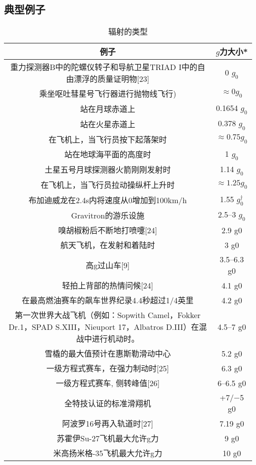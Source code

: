 \subsection{典型例子}
\begin{table}[ht]
\centering
\caption{辐射的类型}\label{GLI}
\begin{tabular}{|c|c}
\hline
\textbf{例子} & \textbf{$g$力大小*}\\
\hline
重力探测器B中的陀螺仪转子和导航卫星TRIAD I中的自由漂浮的质量证明物[23] & 0 $g_0$\\
\hline
乘坐呕吐彗星号飞行器进行抛物线飞行) & $\approx 0 g_0$ \\
\hline
站在月球赤道上 & 0.1654 $g_0$ \\
\hline
站在火星赤道上 & 0.378 $g_0$ \\
\hline
在飞机上，当飞行员按下起落架时 & $\approx 0.75 g_0$ \\
\hline
站在地球海平面的高度时 & 1 $g_0$ \\
\hline
土星五号月球探测器火箭刚刚发射时 & 1.14 $g_0$ \\
\hline
在飞机上，当飞行员拉动操纵杆上升时 & $\approx 1.25 g_0$ \\
\hline
布加迪威龙在2.4s内将速度从0增加到100km/h & 1.55  $g_0^{\dagger}$ \\
\hline
Gravitron的游乐设施 & 2.5–3 $g_0$ \\
\hline
嗅胡椒粉后不断地打喷嚏[24] & 2.9 g0 \\
\hline
航天飞机，在发射和着陆时 & 3 g0 \\
\hline
高g过山车[9] & 3.5–6.3 g0 \\
\hline
轻拍上背部的热情问候[24] & 4.1 g0 \\
\hline
在最高燃油赛车的飙车世界纪录4.4秒超过1/4英里 & 4.2 g0 \\
\hline
第一次世界大战飞机（例如：Sopwith Camel，Fokker Dr.1，SPAD S.XIII，Nieuport 17，Albatros D.III）在混战中进行机动时。 & 4.5–7 g0 \\
\hline
雪橇的最大值预计在惠斯勒滑动中心 & 5.2 g0 \\
\hline
一级方程式赛车，在强力制动时[25] & 6.3 g0 \\
\hline
一级方程式赛车, 侧转峰值[26] & 6–6.5 g0 \\
\hline
全特技认证的标准滑翔机 & +7/−5 g0 \\
\hline
阿波罗16号再入轨道时[27] & 7.19 g0 \\
\hline
苏霍伊Su-27飞机最大允许g力 & 9 g0 \\
\hline
米高扬米格-35飞机最大允许g力 & 10 g0 \\

\end{tabular}
\end{table}
